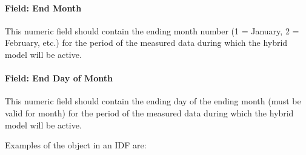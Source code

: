 \paragraph{Field: End Month}\label{field-end-month-hm}

This numeric field should contain the ending month number (1 = January, 2 = February, etc.) for the period of the measured data during which the hybrid model will be active.

\paragraph{Field: End Day of Month}\label{field-end-day-of-month-hm}

This numeric field should contain the ending day of the ending month (must be valid for month) for the period of the measured data during which the hybrid model will be active.

Examples of the object in an IDF are:

